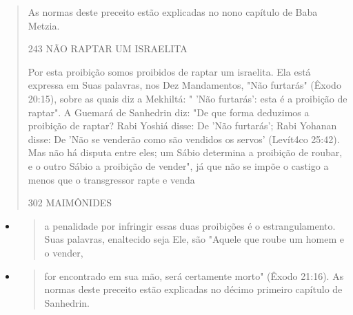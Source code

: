 \begin{quote}
As normas deste preceito estão explicadas no nono capítulo de Baba
Metzia.

243 NÃO RAPTAR UM ISRAELITA

Por esta proibição somos proibidos de raptar um israelita. Ela está
expressa em Suas palavras, nos Dez Mandamentos, "Não furtarás" (Êxodo
20:15), sobre as quais diz a Mekhiltá: " 'Não furtarás': esta é a
proibição de raptar". A Guemará de Sanhedrin diz: "De que forma
deduzimos a proibição de raptar? Rabi Yoshiá disse: De 'Não furtarás';
Rabi Yohanan disse: De 'Não se venderão como são vendidos os servos'
(Levít4co 25:42). Mas não há disputa entre eles; um Sábio determina a
proibição de roubar, e o outro Sábio a proibição de ven­der", já que não
se impõe o castigo a menos que o transgressor rapte e venda

302 MAIMÔNIDES
\end{quote}

\begin{itemize}
\item
  \begin{quote}
  a penalidade por infringir essas duas proibições é o estrangulamento.
  Suas palavras, enaltecido seja Ele, são "Aquele que roube um homem e o
  vender,
  \end{quote}
\item
  \begin{quote}
  for encontrado em sua mão, será certamente morto" (Êxodo 21:16). As
  normas deste preceito estão explicadas no décimo primeiro capí­tulo de
  Sanhedrin.
  \end{quote}
\end{itemize}

